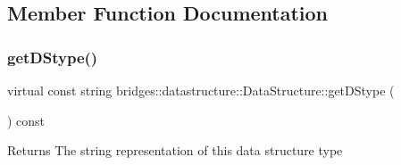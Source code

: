 \subsection{Member Function Documentation}
\mbox{\label{classbridges_1_1datastructure_1_1_data_structure_a4ff66cb34409f11fe9fc647f6d8a22ce}} 
\subsubsection{\texorpdfstring{get\+D\+Stype()}{getDStype()}}
{\footnotesize\ttfamily virtual const string bridges\+::datastructure\+::\+Data\+Structure\+::get\+D\+Stype (\begin{DoxyParamCaption}{ }\end{DoxyParamCaption}) const\hspace{0.3cm}{\ttfamily [pure virtual]}}

\begin{DoxyReturn}{Returns}
The string representation of this data structure type 
\end{DoxyReturn}


